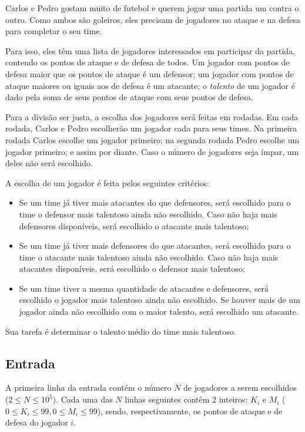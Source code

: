     Carlos e Pedro gostam muito de futebol e querem jogar uma partida um contra o outro. Como ambos são goleiros, eles precisam de jogadores no ataque e na defesa para completar o seu time.

    Para isso, eles têm uma lista de jogadores interessados em participar da partida, contendo os
pontos de ataque e de defesa de todos. Um jogador com pontos de defesa maior que
os pontos de ataque é um defensor; um jogador com pontos de ataque maiores ou
iguais aos de defesa é um atacante; o \textit{talento} de um jogador é dado pela
soma de seus pontos de ataque com seus pontos de defesa.


    Para a divisão ser justa, a escolha dos jogadores será feitas em rodadas. Em
    cada rodada, Carlos e Pedro escolherão um jogador cada para seus times.
Na primeira rodada Carlos escolhe um jogador primeiro; na segunda rodada Pedro
escolhe um jogador primeiro; e assim por diante. Caso o número de jogadores
seja ímpar, um deles não será escolhido.

    A escolha de um jogador é feita pelos seguintes critérios:
\begin{itemize}
    \item Se um time já tiver mais atacantes do que defensores, será escolhido
    para o time o defensor mais talentoso ainda não escolhido. Caso não haja
    mais defensores disponíveis, será escolhido o atacante mais talentoso;
    \item Se um time já tiver mais defensores do que atacantes, será escolhido
    para o time o atacante mais talentoso ainda não escolhido. Caso não haja
    mais atacantes disponíveis, será escolhido o defensor mais talentoso;
    \item Se um time tiver a mesma quantidade de atacantes e defensores, será
    escolhido o jogador mais talentoso ainda não escolhido. Se houver mais de um
    jogador ainda não escolhido com o maior talento, será escolhido um atacante.
\end{itemize}

Sua tarefa é determinar o talento médio do time mais talentoso.

\subsection*{Entrada}

A primeira linha da entrada contém o número $N$ de jogadores a serem escolhidos ($2\leq N\leq 10^5$).
Cada uma das $N$ linhas seguintes contêm 2 inteiros: $K_i$ e $M_i$ ($0\leq
        K_i\leq 99, 0\leq M_i\leq 99$), sendo, respectivamente, os pontos de ataque
e de defesa do jogador $i$.

